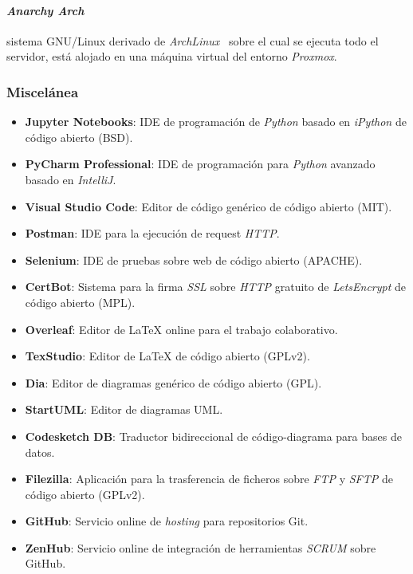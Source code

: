 \paragraph{\textit{Anarchy Arch}}sistema GNU/Linux derivado de \textit{ArchLinux}~\cite{wiki:arch} sobre el cual se ejecuta todo el servidor, está alojado en una máquina virtual del entorno \textit{Proxmox}.

\subsubsection{Miscelánea}
\begin{itemize}
	\item \textbf{Jupyter Notebooks}: IDE de programación de \textit{Python} basado en \textit{iPython} de código abierto (BSD).
	\item \textbf{PyCharm Professional}: IDE de programación para \textit{Python} avanzado basado en \textit{IntelliJ}.
	\item \textbf{Visual Studio Code}: Editor de código genérico de código abierto (MIT).
	\item \textbf{Postman}: IDE para la ejecución de request \textit{HTTP}.
	\item \textbf{Selenium}: IDE de pruebas sobre web de código abierto (APACHE).
	\item \textbf{CertBot}: Sistema para la firma \textit{SSL} sobre \textit{HTTP} gratuito de \textit{LetsEncrypt} de código abierto (MPL).
	\item \textbf{Overleaf}: Editor de \LaTeX{} online para el trabajo colaborativo.
	\item \textbf{TexStudio}: Editor de \LaTeX{} de código abierto (GPLv2).
	\item \textbf{Dia}: Editor de diagramas genérico de código abierto (GPL).
	\item \textbf{StartUML}: Editor de diagramas UML.
	\item \textbf{Codesketch DB}: Traductor bidireccional de código-diagrama para bases de datos.
	\item \textbf{Filezilla}: Aplicación para la trasferencia de ficheros sobre \textit{FTP} y \textit{SFTP} de código abierto (GPLv2).
	\item \textbf{GitHub}: Servicio online de \textit{hosting} para repositorios Git.
	\item \textbf{ZenHub}: Servicio online de integración de herramientas \textit{SCRUM} sobre GitHub.
\end{itemize}